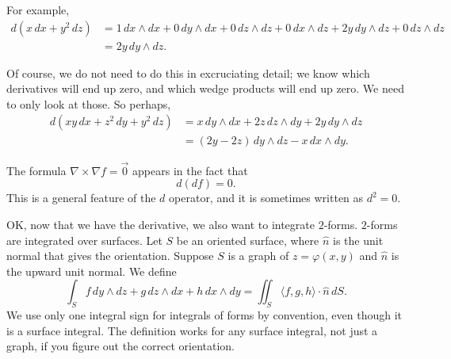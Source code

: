 \documentclass[12pt]{article}
\begin{document}
For example,
\[
\begin{split}
d( x \, dx + y^2 \, dz)
& = 
1 \, dx \wedge dx + 0 \, dy \wedge dx + 0 \, dz \wedge dz
+
0 \, dx \wedge dz + 2y \, dy \wedge dz + 0 \, dz \wedge dz
\\
& =
2 y \, dy \wedge dz .
\end{split}
\]

Of course, we do not need to do this in excruciating detail;
we know which derivatives will end up zero,
and which wedge products will end up zero.  We need to only look at those.
So perhaps,
\[
\begin{split}
d( xy \, dx + z^2 \,dy + y^2 \, dz)
& =
x \, dy \wedge dx
+
2z \, dz \wedge dy
+
2y \, dy \wedge dz
\\
& =
(2y -2z ) \, dy \wedge dz
- x \, dx \wedge dy .
\end{split}
\]

The formula $\nabla \times \nabla f = \vec{0}$ appears in the fact that
\[
d(df) = 0 .
\]
This is a general feature of the $d$ operator, and it is sometimes
written as $d^2 = 0$.

OK, now that we have the derivative, we also want to integrate $2$-forms.
$2$-forms are integrated over surfaces.  Let $S$ be an oriented surface,
where $\hat{n}$ is the unit normal that gives the orientation.
Suppose $S$ is a graph of $z = \varphi(x,y)$ and $\hat{n}$ is the upward unit normal.
We define
\[
\int_S
f\, dy \wedge dz + 
g\, dz \wedge dx +
h\, dx \wedge dy
=
\iint_S \langle f, g, h \rangle \cdot \hat{n} \, dS .
\]
We use only one integral sign for integrals of forms by convention,
even though it is a surface integral.
The definition works for any surface integral, not just a graph,
if you figure out the correct orientation.
\end{document}

